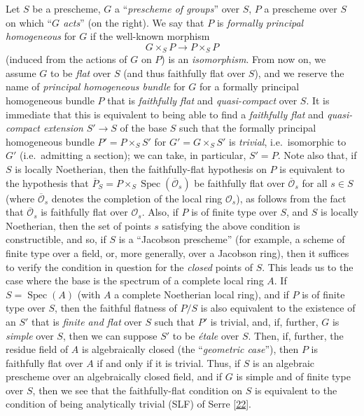 \documentclass{article}
\newcommand{\oldpage}[1]{\marginpar{\footnotesize$\Big\vert$ \textit{p.~#1}}}
\theoremstyle{definition}
\theoremstyle{definition}
\theoremstyle{definition}
\theoremstyle{definition}
\theoremstyle{remark}
\begin{document}
Let \(S\) be a prescheme, \(G\) a ``\emph{prescheme of groups}'' over \(S\), \(P\) a prescheme over \(S\) on which ``\emph{\(G\) acts}'' (on the right).
We say that \(P\) is \emph{formally principal homogeneous} for \(G\) if the well-known morphism
\[
  G\times_S P \to P\times_S P
\]
\oldpage{190-27}(induced from the actions of \(G\) on \(P\)) is an \emph{isomorphism}.
From now on, we assume \(G\) to be \emph{flat} over \(S\) (and thus faithfully flat over \(S\)), and we reserve the name of \emph{principal homogeneous bundle} for \(G\) for a formally principal homogeneous bundle \(P\) that is \emph{faithfully flat} and \emph{quasi-compact} over \(S\).
It is immediate that this is equivalent to being able to find a \emph{faithfully flat} and \emph{quasi-compact extension} \(S'\to S\) of the base \(S\) such that the formally principal homogeneous bundle \(P'=P\times_S S'\) for \(G'=G\times_S S'\) is \emph{trivial}, i.e.~isomorphic to \(G'\) (i.e.~admitting a section);
we can take, in particular, \(S'=P\).
Note also that, if \(S\) is locally Noetherian, then the faithfully-flat hypothesis on \(P\) is equivalent to the hypothesis that \(\overline{P}_S=P\times_S\operatorname{Spec}(\overline{{\mathscr{O}}}_s)\) be faithfully flat over \(\overline{{\mathscr{O}}}_s\) for all \(s\in S\) (where \(\overline{{\mathscr{O}}}_s\) denotes the completion of the local ring \({\mathscr{O}}_s\)), as follows from the fact that \(\overline{{\mathscr{O}}}_s\) is faithfully flat over \({\mathscr{O}}_s\).
Also, if \(P\) is of finite type over \(S\), and \(S\) is locally Noetherian, then the set of points \(s\) satisfying the above condition is constructible, and so, if \(S\) is a ``Jacobson prescheme'' (for example, a scheme of finite type over a field, or, more generally, over a Jacobson ring), then it suffices to verify the condition in question for the \emph{closed} points of \(S\).
This leads us to the case where the base is the spectrum of a complete local ring \(A\).
If \(S=\operatorname{Spec}(A)\) (with \(A\) a complete Noetherian local ring), and if \(P\) is of finite type over \(S\), then the faithful flatness of \(P/S\) is also equivalent to the existence of an \(S'\) that is \emph{finite and flat} over \(S\) such that \(P'\) is trivial, and, if, further, \(G\) is \emph{simple} over \(S\), then we can suppose \(S'\) to be \emph{étale} over \(S\).
Then, if, further, the residue field of \(A\) is algebraically closed (the ``\emph{geometric case}''), then \(P\) is faithfully flat over \(A\) if and only if it is trivial.
Thus, if \(S\) is an algebraic prescheme over an algebraically closed field, and if \(G\) is simple and of finite type over \(S\), then we see that the faithfully-flat condition on \(S\) is equivalent to the condition of being analytically trivial (SLF) of Serre {[}\protect\hyperlink{ref-Ser1958a}{22}{]}.
\end{document}
